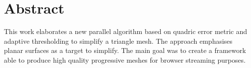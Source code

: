 
\thispagestyle{plain}

\section*{Abstract}
This work elaborates a new parallel algorithm based on quadric error metric and adaptive thresholding to simplify a triangle mesh. The approach emphasises planar surfaces as a target to simplify. The main goal was to create a framework able to produce high quality progressive meshes for browser streaming purposes.

\switchlanguage{\lang} %
